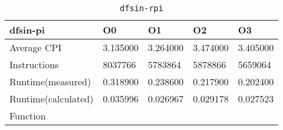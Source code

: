 \begin{table}[ht!]
\centering
\caption{\texttt{dfsin-rpi}}
\label{tab:dfsin-rpi}
\begin{tabular}{|l|l|l|l|l|}
\hline
\textbf{dfsin-pi}	&	\textbf{O0}	&	\textbf{O1}	&	\textbf{O2}	&	\textbf{O3}	\\\hline\hline
Average CPI	&	3.135000	&	3.264000	&	3.474000	&	3.405000	\\\hline
Instructions	&	8037766	&	5783864	&	5878866	&	5659064	\\\hline
Runtime(measured)	&	0.318900	&	0.238600	&	0.217900	&	0.202400	\\\hline
Runtime(calculated)	&	0.035996	&	0.026967	&	0.029178	&	0.027523	\\\hline
Function	&		&		&		&		\\\hline
\end{tabular}
\end{table}
